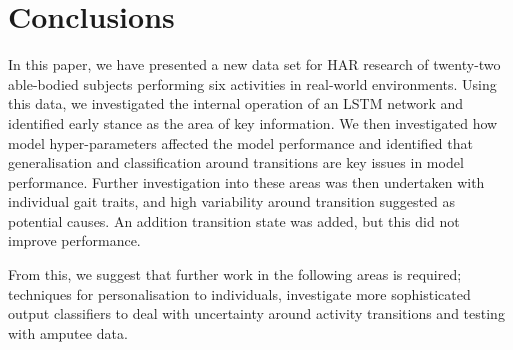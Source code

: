 \documentclass[sensors,article,submit,moreauthors,pdftex]{Definitions/mdpi}
\begin{document}
\section{Conclusions}
\label{sec:conclusion}
In this paper, we have presented a new data set for HAR research of twenty-two able-bodied subjects performing six activities in real-world environments. Using this data, we investigated the internal operation of an LSTM network and identified early stance as the area of key information. We then investigated how model hyper-parameters affected the model performance and identified that generalisation and classification around transitions are key issues in model performance. Further investigation into these areas was then undertaken with individual gait traits, and high variability around transition suggested as potential causes. An addition transition state was added, but this did not improve performance. 

From this, we suggest that further work in the following areas is required; techniques for personalisation to individuals, investigate more sophisticated output classifiers to deal with uncertainty around activity transitions and testing with amputee data.


\vspace{6pt} 



\end{document}

